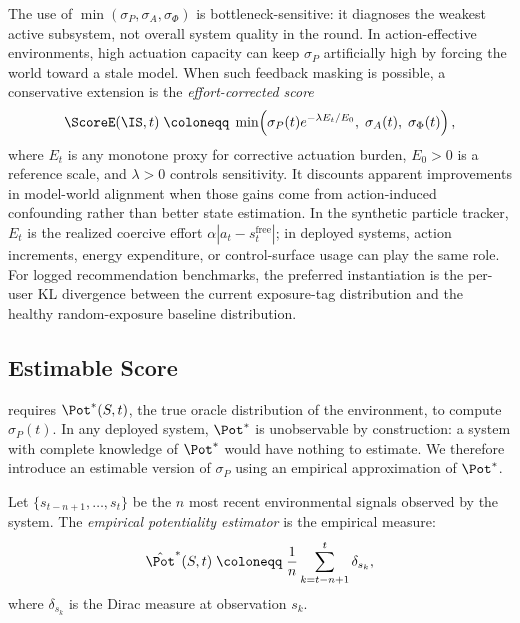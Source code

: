 \begin{remark}
The use of $\min(\sigma_P, \sigma_A, \sigma_\Phi)$ is bottleneck-sensitive:
it diagnoses the weakest active subsystem, not overall system quality in the
round. In action-effective environments, high actuation capacity can keep
$\sigma_P$ artificially high by forcing the world toward a stale model.
When such feedback masking is possible, a conservative extension is the
\emph{effort-corrected score}
\[
  \ScoreE(\IS,t)
  \;\coloneqq\;
  \min\!\left(
    \sigma_P(t)e^{-\lambda E_t/E_0},\;\sigma_A(t),\;\sigma_\Phi(t)
  \right),
\]
where $E_t$ is any monotone proxy for corrective actuation burden,
$E_0 > 0$ is a reference scale, and $\lambda > 0$ controls sensitivity. It
discounts apparent improvements in model-world alignment when those gains come
from action-induced confounding rather than better state estimation. In the
synthetic particle tracker, $E_t$ is the realized coercive effort
$\alpha |a_t - s_t^{\mathrm{free}}|$; in deployed systems, action increments,
energy expenditure, or control-surface usage can play the same role.
For logged recommendation benchmarks, the preferred instantiation is the
per-user KL divergence between the current exposure-tag distribution and the
healthy random-exposure baseline distribution.
\end{remark}

\subsection{Estimable Score}

 requires $\Pot^*(S,t)$, the true oracle
distribution of the environment, to compute $\sigma_P(t)$.
In any deployed system, $\Pot^*$ is unobservable by construction: a system
with complete knowledge of $\Pot^*$ would have nothing to estimate.
We therefore introduce an estimable version of $\sigma_P$ using an
empirical approximation of $\Pot^*$.

\begin{definition}\label{def:potestimator}
Let $\{s_{t-n+1}, \ldots, s_t\}$ be the $n$ most recent environmental
signals observed by the system.
The \emph{empirical potentiality estimator} is the empirical measure:
\[
  \hat{\Pot}^*(S,t) \;\coloneqq\; \frac{1}{n} \sum_{k=t-n+1}^{t} \delta_{s_k},
\]
where $\delta_{s_k}$ is the Dirac measure at observation $s_k$.
\end{definition}

